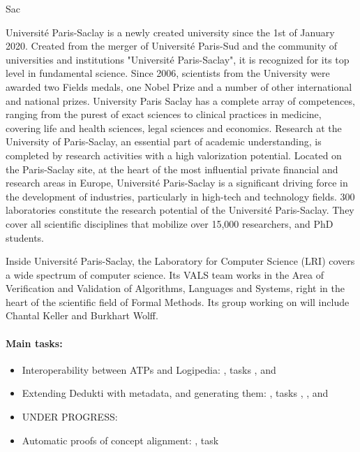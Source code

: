 \begin{sitedescription}{Sac}


Université Paris-Saclay is a newly created university since the 1st of
January 2020. Created from the merger of Université Paris-Sud and the
community of universities and institutions "Université Paris-Saclay", it
is recognized for its top level in fundamental science.  Since 2006,
scientists from the University were awarded two Fields medals, one Nobel
Prize and a number of other international and national prizes.
University Paris Saclay has a complete array of competences, ranging
from the purest of exact sciences to clinical practices in medicine,
covering life and health sciences, legal sciences and economics.
Research at the University of Paris-Saclay, an essential part of
academic understanding, is completed by research activities with a high
valorization potential. Located on the Paris-Saclay site, at the heart
of the most influential private financial and research areas in Europe,
Université Paris-Saclay is a significant driving force in the
development of industries, particularly in high-tech and technology
fields. 300 laboratories constitute the research potential of the
Université Paris-Saclay. They cover all scientific disciplines that
mobilize over 15,000 researchers, and PhD students.

Inside Université Paris-Saclay, the Laboratory for Computer Science
(LRI) covers a wide spectrum of computer science. Its VALS team works in
the Area of Verification and Validation of Algorithms, Languages and
Systems, right in the heart of the scientific field of Formal Methods.
Its group working on \pn will include Chantal Keller and Burkhart Wolff.


\paragraph{Main tasks:}

\begin{itemize}
\item Interoperability between ATPs and Logipedia: , tasks
  ,  and
\item Extending Dedukti with metadata, and generating them:
  , tasks ,
  ,  and
\item UNDER PROGRESS: 
\item Automatic proofs of concept alignment: , task
\end{itemize}



\end{sitedescription}
